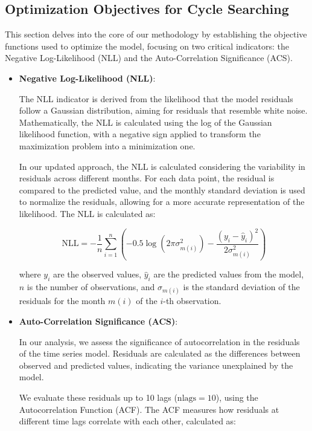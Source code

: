 \documentclass{article}
\begin{document}
\subsection{Optimization Objectives for Cycle Searching}

This section delves into the core of our methodology by establishing the objective functions used to optimize the model, focusing on two critical indicators: the Negative Log-Likelihood (NLL) and the Auto-Correlation Significance (ACS).

\begin{itemize}
  \item \textbf{Negative Log-Likelihood (NLL)}:
  
  The NLL indicator is derived from the likelihood that the model residuals follow a Gaussian distribution, aiming for residuals that resemble white noise. Mathematically, the NLL is calculated using the log of the Gaussian likelihood function, with a negative sign applied to transform the maximization problem into a minimization one.

  In our updated approach, the NLL is calculated considering the variability in residuals across different months. For each data point, the residual is compared to the predicted value, and the monthly standard deviation is used to normalize the residuals, allowing for a more accurate representation of the likelihood. The NLL is calculated as:

  \[
  \text{NLL} = - \frac{1}{n} \sum_{i=1}^{n} \left( -0.5 \log(2 \pi \sigma_{m(i)}^2) - \frac{(y_i - \hat{y}_i)^2}{2 \sigma_{m(i)}^2} \right)
  \]

  where \(y_i\) are the observed values, \(\hat{y}_i\) are the predicted values from the model, \(n\) is the number of observations, and \(\sigma_{m(i)}\) is the standard deviation of the residuals for the month \(m(i)\) of the \(i\)-th observation.
  
  \item \textbf{Auto-Correlation Significance (ACS)}:

  In our analysis, we assess the significance of autocorrelation in the residuals of the time series model. Residuals are calculated as the differences between observed and predicted values, indicating the variance unexplained by the model.

  We evaluate these residuals up to 10 lags (\(\text{nlags} = 10\)), using the Autocorrelation Function (ACF). The ACF measures how residuals at different time lags correlate with each other, calculated as:


\end{itemize}
\end{document}
